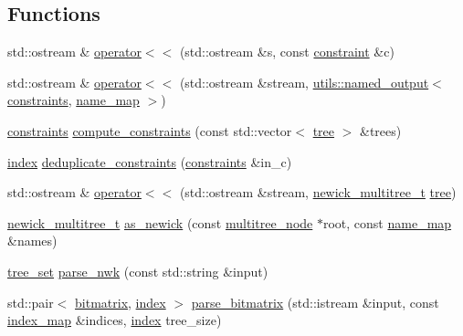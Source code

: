 \subsection*{Functions}
\begin{DoxyCompactItemize}
\item 
std\+::ostream \& \hyperlink{namespaceterraces_afe895c6224b473a8ac42ee20a43b60dc}{operator$<$$<$} (std\+::ostream \&s, const \hyperlink{structterraces_1_1constraint}{constraint} \&c)
\item 
std\+::ostream \& \hyperlink{namespaceterraces_afda20576b9d2f9c56f3f6d06efc030fd}{operator$<$$<$} (std\+::ostream \&stream, \hyperlink{structterraces_1_1utils_1_1named__output}{utils\+::named\+\_\+output}$<$ \hyperlink{namespaceterraces_a6f603ffd30ed4d902fce6424492e0581}{constraints}, \hyperlink{namespaceterraces_a4ef0217fe5aed881737d9bc5a8d45dca}{name\+\_\+map} $>$)
\item 
\hyperlink{namespaceterraces_a6f603ffd30ed4d902fce6424492e0581}{constraints} \hyperlink{namespaceterraces_adbc8509d9ed99e4e0ef57af54c89e905}{compute\+\_\+constraints} (const std\+::vector$<$ \hyperlink{namespaceterraces_a07aaf7feec4a22c6cdefc14c5a81bdd0}{tree} $>$ \&trees)
\item 
\hyperlink{namespaceterraces_adbc33ccb543d1634e96d0eb02e472c77}{index} \hyperlink{namespaceterraces_a13888c94deeee29c8f5157c9071e3946}{deduplicate\+\_\+constraints} (\hyperlink{namespaceterraces_a6f603ffd30ed4d902fce6424492e0581}{constraints} \&in\+\_\+c)
\item 
std\+::ostream \& \hyperlink{namespaceterraces_ad5d0342efed28b0bd79f604eb73f9b61}{operator$<$$<$} (std\+::ostream \&stream, \hyperlink{structterraces_1_1newick__multitree__t}{newick\+\_\+multitree\+\_\+t} \hyperlink{namespaceterraces_a07aaf7feec4a22c6cdefc14c5a81bdd0}{tree})
\item 
\hyperlink{structterraces_1_1newick__multitree__t}{newick\+\_\+multitree\+\_\+t} \hyperlink{namespaceterraces_ac1f8e7b342ecb4934d77c309c3ac8692}{as\+\_\+newick} (const \hyperlink{structterraces_1_1multitree__node}{multitree\+\_\+node} $\ast$root, const \hyperlink{namespaceterraces_a4ef0217fe5aed881737d9bc5a8d45dca}{name\+\_\+map} \&names)
\item 
\hyperlink{structterraces_1_1tree__set}{tree\+\_\+set} \hyperlink{namespaceterraces_add61915a31828774ee0371d443031c29}{parse\+\_\+nwk} (const std\+::string \&input)
\item 
std\+::pair$<$ \hyperlink{classterraces_1_1bitmatrix}{bitmatrix}, \hyperlink{namespaceterraces_adbc33ccb543d1634e96d0eb02e472c77}{index} $>$ \hyperlink{namespaceterraces_af52559863b67502f00d68853f50c69af}{parse\+\_\+bitmatrix} (std\+::istream \&input, const \hyperlink{namespaceterraces_a148f3e895119c2a72d995caae669e40d}{index\+\_\+map} \&indices, \hyperlink{namespaceterraces_adbc33ccb543d1634e96d0eb02e472c77}{index} tree\+\_\+size)

\end{DoxyCompactItemize}
